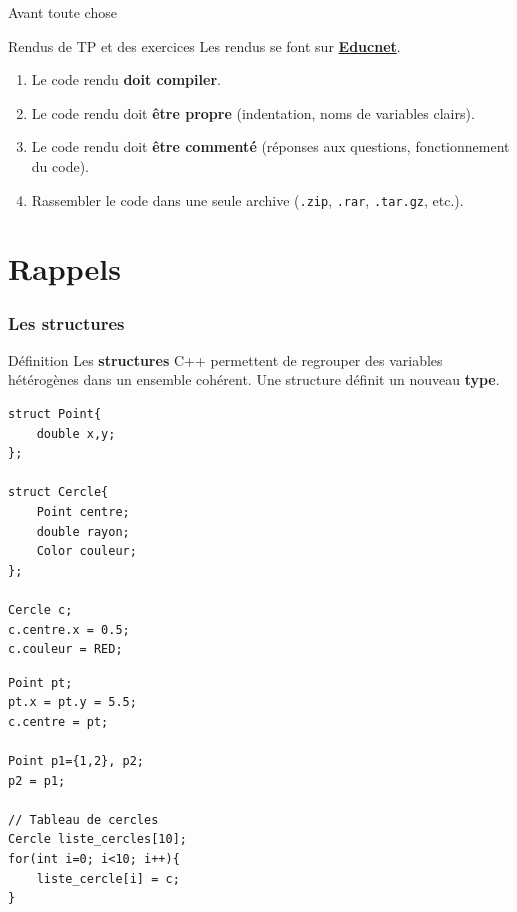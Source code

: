 
\subtitle{Fichiers séparés - Opérateurs}
\date[6 oct. 2017]{Vendredi 13 octobre 2017}
\maketitle

\begin{frame}{Avant toute chose}
  \begin{alertblock}{Rendus de TP et des exercices}
  Les rendus se font sur \href{https://educnet.enpc.fr}{\textbf{Educnet}}.
  \begin{enumerate}
    \item Le code rendu \textbf{doit compiler}.
    \item Le code rendu doit \textbf{être propre} (indentation, noms de variables clairs).
    \item Le code rendu doit \textbf{être commenté} (réponses aux questions, fonctionnement du code).
    \item Rassembler le code dans une seule archive (\texttt{.zip}, \texttt{.rar}, \texttt{.tar.gz}, etc.).
  \end{enumerate}
  \end{alertblock}
\end{frame}

\section{Rappels}

\begin{frame}[fragile=singleslide]
	\frametitle{Les structures}
	\begin{block}{Définition}
		Les \textbf{structures} C++ permettent de regrouper des variables hétérogènes dans un ensemble cohérent. Une structure définit un nouveau \textbf{type}.
	\end{block}

\begin{minipage}{0.47\linewidth}
		\begin{verbatim}
struct Point{
	double x,y;
};

struct Cercle{
    Point centre;
    double rayon;
    Color couleur;
};

Cercle c;
c.centre.x = 0.5;
c.couleur = RED;
		\end{verbatim}
\end{minipage}
\begin{minipage}{0.47\linewidth}
		\begin{verbatim}
Point pt;
pt.x = pt.y = 5.5;
c.centre = pt;

Point p1={1,2}, p2;
p2 = p1;

// Tableau de cercles
Cercle liste_cercles[10];
for(int i=0; i<10; i++){
	liste_cercle[i] = c;
}
		\end{verbatim}
\end{minipage}
\end{frame}

